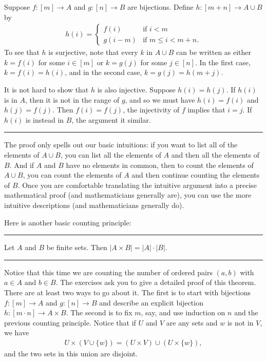 \documentclass[letterpaper,10pt,english]{sphinxmanual}
\begin{document}
\sphinxAtStartPar
{} Suppose \(f : [m] \to A\) and \(g : [n] \to B\) are bijections. Define \(h : [m + n] \to A \cup B\) by
\begin{equation*}
\begin{split}h(i) =
  \begin{cases}
    f(i) & \mbox{if $i < m$} \\
    g(i - m) & \mbox{if $m \leq i < m + n$.}
  \end{cases}\end{split}
\end{equation*}
\sphinxAtStartPar
To see that \(h\) is surjective, note that every \(k\) in \(A \cup B\) can be written as either \(k = f(i)\) for some \(i \in [m]\) or \(k = g(j)\) for some \(j \in [n]\). In the first case, \(k = f(i) = h(i)\), and in the second case, \(k = g(j) = h(m + j)\).

\sphinxAtStartPar
It is not hard to show that \(h\) is also injective. Suppose \(h(i) = h(j)\). If \(h(i)\) is in \(A\), then it is not in the range of \(g\), and so we must have \(h(i) = f(i)\) and \(h(j) = f(j)\). Then \(f(i) = f(j)\), the injectivity of \(f\) implies that \(i = j\). If \(h(i)\) is instead in \(B\), the argument it similar.


\bigskip\hrule\bigskip


\sphinxAtStartPar
The proof only spells out our basic intuitions: if you want to list all of the elements of \(A \cup B\), you can list all the elements of \(A\) and then all the elements of \(B\). And if \(A\) and \(B\) have no elements in common, then to count the elements of \(A \cup B\), you can count the elements of \(A\) and then continue counting the elements of \(B\). Once you are comfortable translating the intuitive argument into a precise mathematical proof (and mathematicians generally are), you can use the more intuitive descriptions (and mathematicians generally do).

\sphinxAtStartPar
Here is another basic counting principle:


\bigskip\hrule\bigskip


\sphinxAtStartPar
{} Let \(A\) and \(B\) be finite sets. Then \(| A \times B | = | A | \cdot | B |\).


\bigskip\hrule\bigskip


\sphinxAtStartPar
Notice that this time we are counting the number of ordered pairs \((a, b)\) with \(a \in A\) and \(b \in B\). The exercises ask you to give a detailed proof of this theorem. There are at least two ways to go about it. The first is to start with bijections \(f : [m] \to A\) and \(g : [n] \to B\) and describe an explicit bijection \(h : [m \cdot n] \to A \times B\). The second is to fix \(m\), say, and use induction on \(n\) and the previous counting principle. Notice that if \(U\) and \(V\) are any sets and \(w\) is not in \(V\), we have
\begin{equation*}
\begin{split}U \times (V \cup \{ w \}) = (U \times V) \cup (U \times \{w\}),\end{split}
\end{equation*}
\sphinxAtStartPar
and the two sets in this union are disjoint.
\end{document}
